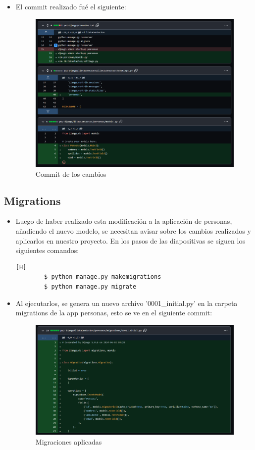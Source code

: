 \documentclass{article}
\begin{document}
\begin{itemize}
            \item El commit realizado fué el siguiente:
            
        \begin{figure}[H]
            \centering
            \includegraphics[width=0.7\linewidth]{img/Commit2.png}
            \caption{Commit de los cambios}
            \label{fig:enter-label}
        \end{figure}
        \end{itemize}
        
        \subsection{Migrations}
        \begin{itemize}
            \item Luego de haber realizado esta modificación a la aplicación de personas, añadiendo el nuevo modelo, se necesitan avisar sobre los cambios realizados y aplicarlos en nuestro proyecto. En los pasos de las diapositivas se siguen los siguientes comandos:
        
        \begin{lstlisting}[language=bash,caption={Makemigrations y migrate}][H]
        $ python manage.py makemigrations
        $ python manage.py migrate
        \end{lstlisting}

            \item Al ejecutarlos, se genera un nuevo archivo '0001\_initial.py' en la carpeta migrations de la app personas, esto se ve en el siguiente commit:

        \begin{figure}[H]
            \centering
            \includegraphics[width=0.7\linewidth]{img/Commit3.png}
            \caption{Migraciones aplicadas}
            \label{fig:enter-label}
        \end{figure}
        \end{itemize}
        
\end{document}
